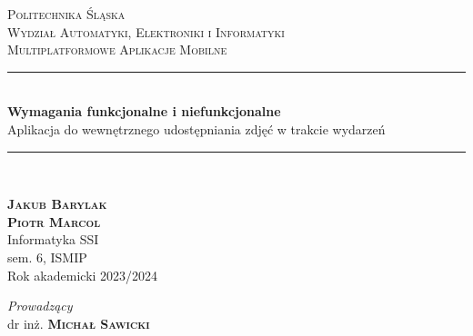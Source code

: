 \begin{titlepage} %
    \newcommand{\HRule}{\rule{\linewidth}{0.5mm}} %

    \center %


    \textsc{\LARGE Politechnika Śląska}\\[0.5cm] %

    \textsc{\Large Wydział Automatyki, Elektroniki i Informatyki}\\[1cm] %

    \textsc{\large Multiplatformowe Aplikacje Mobilne}\\[0.5cm] %


    \HRule\\[0.4cm]

    { {\LARGE\bfseries Wymagania funkcjonalne i niefunkcjonalne}\\[0.2cm] {\Large Aplikacja do wewnętrznego udostępniania zdjęć w trakcie wydarzeń}}\\[0.2cm] %

    \HRule\\[1.5cm]


    \begin{minipage}{0.5\textwidth}
        \begin{flushleft}
            \textsc{\bfseries
                Jakub Barylak
                \\Piotr Marcol}\\
            Informatyka SSI
            \\sem. 6, ISMIP\\
            Rok akademicki 2023/2024
        \end{flushleft}
    \end{minipage}
    \begin{minipage}{0.4\textwidth}
        \begin{flushright}
            \textit{Prowadzący}\\
            dr inż. \textsc{\bfseries Michał Sawicki}
        \end{flushright}
    \end{minipage}




\end{titlepage}
